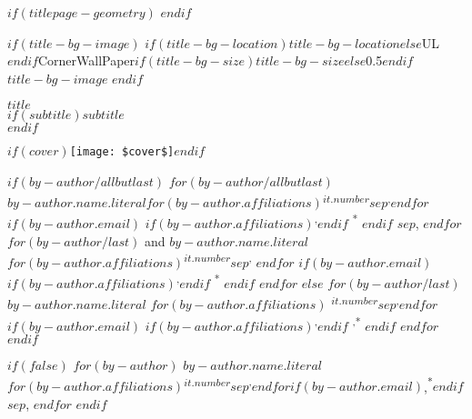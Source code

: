 
$if(titlepage-geometry)$
$endif$
\begin{minipage}[b][\textheight][s]{\textwidth}
\raggedright


$if(title-bg-image)$
\This$if(title-bg-location)$$title-bg-location$$else$UL$endif$CornerWallPaper{$if(title-bg-size)$$title-bg-size$$else$0.5$endif$}{$title-bg-image$}
$endif$


{\huge\bfseries\nohyphens{$title$}}\\[1\baselineskip]
$if(subtitle)${\large{$subtitle$}}\\[4\baselineskip]$endif$

\vspace{1\baselineskip}

$if(cover)$\texttt{[image: \$cover\$]}$endif$

\vspace{1\baselineskip}

$if(by-author/allbutlast)$
$for(by-author/allbutlast)$
 {\large{$by-author.name.literal$}}$for(by-author.affiliations)${\textsuperscript{$it.number$}}$sep$\textsuperscript{,}$endfor$%
$if(by-author.email)$%
$if(by-author.affiliations)$\textsuperscript{,}$endif$%
{\textsuperscript{*}}%
$endif$%
$sep$,
$endfor$
$for(by-author/last)$%
{ and \large{$by-author.name.literal$}}%
$for(by-author.affiliations)${\textsuperscript{$it.number$}}$sep$\textsuperscript{,}%
$endfor$%
$if(by-author.email)$%
$if(by-author.affiliations)$\textsuperscript{,}$endif$%
{\textsuperscript{*}}%
$endif$%
$endfor$
$else$
$for(by-author/last)$%
{\large{$by-author.name.literal$}}%
$for(by-author.affiliations)$%
{\textsuperscript{$it.number$}}$sep$\textsuperscript{,}$endfor$%
$if(by-author.email)$%
$if(by-author.affiliations)$\textsuperscript{,}$endif$%
{\textsuperscript{,*}}%
$endif$%
$endfor$
$endif$

$if(false)$
  $for(by-author)$
    {$by-author.name.literal$}$for(by-author.affiliations)${\textsuperscript{$it.number$}}$sep${\textsuperscript{,}}$endfor$$if(by-author.email)$,{\textsuperscript{*}}$endif$$sep$,
$endfor$
$endif$


\end{minipage}
